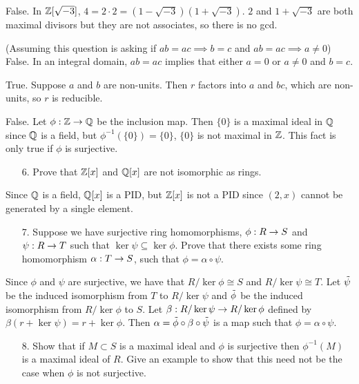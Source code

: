 \documentclass{hmwk}
\begin{document}
\pre False. In $\mathbb{Z}[\sqrt{-3}]$, $4 = 2 \cdot 2 = (1 - \sqrt{-3})(1 + \sqrt{-3})$. $2$ and $1 + \sqrt{-3}$ are both maximal divisors but they are not associates, so there is no gcd. 

\pre (Assuming this question is asking if $ab = ac \implies b=c$ and $ab = ac \implies a \neq 0$) False. In an integral domain, $ab = ac$ implies that either $a = 0$ or $a \neq 0$ and $b = c$. 

\pre True. Suppose $a$ and $b$ are non-units. Then $r$ factors into $a$ and $bc$, which are non-units, so $r$ is reducible. 

\pre False. Let $\phi: \mathbb{Z} \rightarrow \mathbb{Q}$ be the inclusion map. Then $\{0\}$ is a maximal ideal in $\mathbb{Q}$ since $\mathbb{Q}$ is a field, but $\phi^{-1}(\{0\}) = \{0\}$, $\{0\}$ is not maximal in $\mathbb{Z}$. This fact is only true if $\phi$ is surjective. 

\begin{itemize}
    \item[6.] Prove that $\mathbb{Z}[x]$ and $\mathbb{Q}[x]$ are not isomorphic as rings. 
\end{itemize}

\pre Since $\mathbb{Q}$ is a field, $\mathbb{Q}[x]$ is a PID, but $\mathbb{Z}[x]$ is not a PID since $(2, x)$ cannot be generated by a single element. 

\begin{itemize}
    \item[7.] Suppose we have surjective ring homomorphisms, $\phi : R \rightarrow S$ and $\psi : R \rightarrow T$ such that $\ker \psi \subseteq \ker \phi$. Prove that there exists some ring homomorphism $\alpha : T \rightarrow S$, such that $\phi = \alpha \circ \psi.$ 
\end{itemize}

\pre Since $\phi$ and $\psi$ are surjective, we have that $R/\ker\phi \cong S$ and $R/\ker\psi \cong T$. Let $\Tilde{\psi}$ be the induced isomorphism from $T$ to $R/\ker\psi$ and $\Tilde{\phi}$ be the induced isomorphism from $R/\ker\phi$ to $S$. Let $\beta: R/\ker\psi \rightarrow R/\ker\phi$ defined by $\beta(r + \ker\psi) = r + \ker\phi$. Then $\alpha = \Tilde{\phi}\circ\beta\circ\Tilde{\psi}$ is a map such that $\phi = \alpha \circ \psi$.

\begin{itemize}
    \item[8.] Show that if $M \subset S$ is a maximal ideal and $\phi$ is surjective then $\phi^{-1}(M)$ is a maximal ideal of $R$. Give an example to show that this need not be the case when $\phi$ is not surjective. 
\end{itemize}
\end{document}
